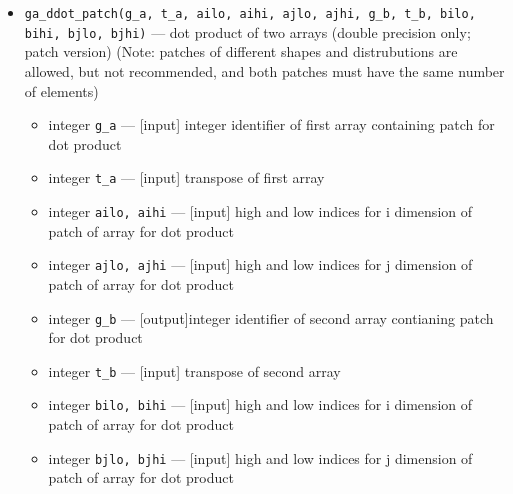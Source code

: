 \begin{itemize}
\item {\tt ga\_ddot\_patch(g\_a, t\_a, ailo, aihi, ajlo, ajhi,
         g\_b, t\_b, bilo, bihi, bjlo, bjhi)} --- dot product of two arrays (double precision
  only; patch version) (Note: patches of different shapes and distrubutions
are allowed, but not recommended, and both patches must have the same number
of elements)
\begin{itemize}
\item      integer {\tt g\_a}            --- [input] integer identifier of first array containing
                                               patch for dot product
\item     integer {\tt t\_a}             --- [input] transpose of first array
\item     integer {\tt ailo, aihi}       --- [input] high and low indices for i dimension of
                                               patch of array  for dot product
\item     integer {\tt ajlo, ajhi}       --- [input] high and low indices for j dimension of
                                               patch of array for dot product
\item      integer {\tt g\_b}            --- [output]integer identifier of second array contianing
                                               patch for dot product
\item     integer {\tt t\_b}             --- [input] transpose of second array
\item     integer {\tt bilo, bihi}       --- [input] high and low indices for i dimension of
                                               patch of array  for dot product
\item     integer {\tt bjlo, bjhi}       --- [input] high and low indices for j dimension of
                                               patch of array  for dot product
\end{itemize}


\end{itemize}
